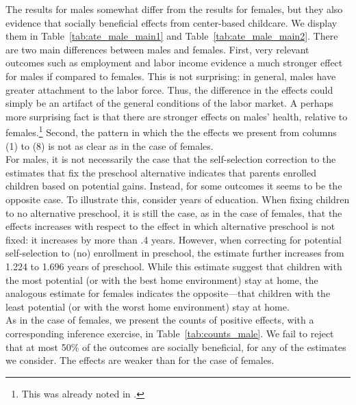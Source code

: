 



\noindent The results for males somewhat differ from the results for females, but they also evidence that socially beneficial effects from center-based childcare. We display them in Table~\ref{tab:ate_male_main1} and Table~\ref{tab:ate_male_main2}. There are two main differences between males and females. First, very relevant outcomes such as employment and labor income evidence a much stronger effect for males if compared to females. This is not surprising: in general, males have greater attachment to the labor force. Thus, the difference in the effects could simply be an artifact of the general conditions of the labor market. A perhaps more surprising fact is that there are stronger effects on males' health, relative to females.\footnote{This was already noted in \citet{Campbell_Conti_etal_2014_EarlyChildhoodInvestments}.} Second, the pattern in which the the effects we present from columns (1) to (8) is not as clear as in the case of females.\\

\noindent For males, it is not necessarily the case that the self-selection correction to the estimates that fix the preschool alternative indicates that parents enrolled children based on potential gains. Instead, for some outcomes it seems to be the opposite case. To illustrate this, consider years of education. When fixing children to no alternative preschool, it is still the case, as in the case of females, that the effects increases with respect to the effect in which alternative preschool is not fixed: it increases by more than .4 years. However, when correcting for potential self-selection to (no) enrollment in preschool, the estimate further increases from 1.224 to 1.696 years of preschool. While this estimate suggest that children with the most potential (or with the best home environment) stay at home, the analogous estimate for females indicates the opposite---that children with the least potential (or with the worst home environment) stay at home.\\

\noindent As in the case of females, we present the counts of positive effects, with a corresponding inference exercise, in Table~\ref{tab:counts_male}. We fail to reject that at most 50\% of the outcomes are socially beneficial, for any of the estimates we consider. The effects are weaker than for the case of females.

